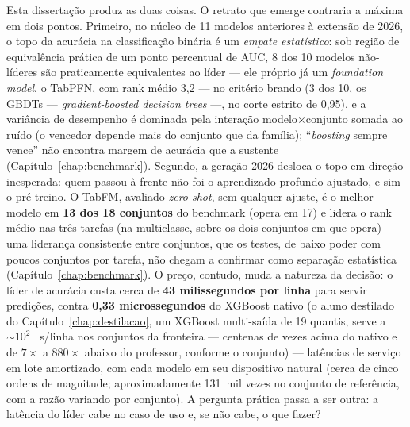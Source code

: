 Esta dissertação produz as duas coisas. O retrato que emerge contraria
a máxima em dois pontos. Primeiro, no
núcleo de 11 modelos anteriores à extensão de 2026, o topo da
acurácia na classificação binária é um \emph{empate
estatístico}: sob região de equivalência prática de um ponto percentual de
AUC, 8 dos 10 modelos não-líderes são praticamente equivalentes ao
líder --- ele próprio já um \emph{foundation model}, o TabPFN, com rank
médio 3,2 --- no critério brando (3 dos 10, os GBDTs ---
\emph{gradient-boosted decision trees} ---, no corte estrito de
0,95), e a variância de desempenho é dominada pela interação
modelo$\times$conjunto somada ao ruído (o vencedor depende mais do
conjunto que da
família); ``\emph{boosting} sempre vence'' não encontra margem de
acurácia que a sustente (Capítulo~\ref{chap:benchmark}). Segundo, a
geração 2026 desloca o topo em direção inesperada: quem passou à
frente não foi o aprendizado profundo ajustado, e sim o pré-treino. O
TabFM, avaliado \emph{zero-shot}, sem qualquer ajuste, é o melhor
modelo em \textbf{13 dos 18 conjuntos} do benchmark (opera em 17) e
lidera o rank
médio nas três tarefas (na multiclasse, sobre os dois conjuntos em que
opera) --- uma liderança consistente entre conjuntos,
que os testes, de baixo poder com poucos conjuntos por tarefa, não
chegam a confirmar como separação estatística
(Capítulo~\ref{chap:benchmark}). O preço, contudo, muda a natureza da
decisão: o
líder de acurácia custa cerca de \textbf{43 milissegundos por linha} para
servir predições, contra \textbf{0,33 microssegundos} do XGBoost
nativo (o aluno destilado do Capítulo~\ref{chap:destilacao}, um
XGBoost multi-saída de 19 quantis, serve a ${\sim}10^2$~\textmu
s/linha nos conjuntos da fronteira --- centenas de vezes acima do
nativo e de $7\times$ a $880\times$ abaixo do professor, conforme o
conjunto) ---
latências de serviço em lote amortizado, com cada modelo em seu
dispositivo natural (cerca de cinco ordens de magnitude;
aproximadamente 131~mil
vezes no conjunto de referência, com a razão variando por conjunto). A
pergunta prática passa a ser outra: a latência do líder cabe no caso de
uso e, se não cabe, o que fazer?

